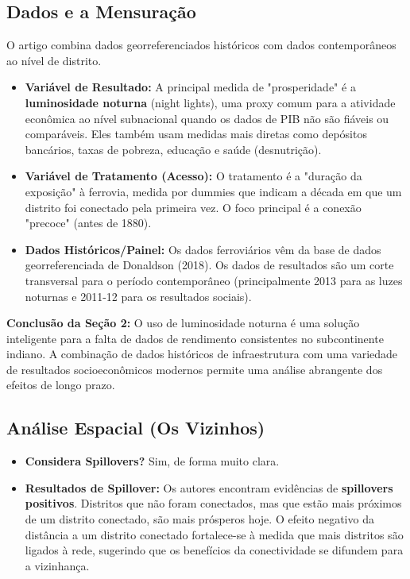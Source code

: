 \documentclass[12pt, a4paper]{article}
\begin{document}
\subsection{Dados e a Mensuração}
O artigo combina dados georreferenciados históricos com dados contemporâneos ao nível de distrito.
\begin{itemize}
    \item \textbf{Variável de Resultado:} A principal medida de "prosperidade" é a \textbf{luminosidade noturna} (night lights), uma proxy comum para a atividade econômica ao nível subnacional quando os dados de PIB não são fiáveis ou comparáveis. Eles também usam medidas mais diretas como depósitos bancários, taxas de pobreza, educação e saúde (desnutrição).
    \item \textbf{Variável de Tratamento (Acesso):} O tratamento é a "duração da exposição" à ferrovia, medida por dummies que indicam a década em que um distrito foi conectado pela primeira vez. O foco principal é a conexão "precoce" (antes de 1880).
    \item \textbf{Dados Históricos/Painel:} Os dados ferroviários vêm da base de dados georreferenciada de Donaldson (2018). Os dados de resultados são um corte transversal para o período contemporâneo (principalmente 2013 para as luzes noturnas e 2011-12 para os resultados sociais).
\end{itemize}

\noindent\textbf{Conclusão da Seção 2:} O uso de luminosidade noturna é uma solução inteligente para a falta de dados de rendimento consistentes no subcontinente indiano. A combinação de dados históricos de infraestrutura com uma variedade de resultados socioeconômicos modernos permite uma análise abrangente dos efeitos de longo prazo.

\subsection{Análise Espacial (Os Vizinhos)}

\begin{itemize}
    \item \textbf{Considera Spillovers?} Sim, de forma muito clara.
    \item \textbf{Resultados de Spillover:} Os autores encontram evidências de \textbf{spillovers positivos}. Distritos que não foram conectados, mas que estão mais próximos de um distrito conectado, são mais prósperos hoje. O efeito negativo da distância a um distrito conectado fortalece-se à medida que mais distritos são ligados à rede, sugerindo que os benefícios da conectividade se difundem para a vizinhança.
\end{itemize}
\end{document}
